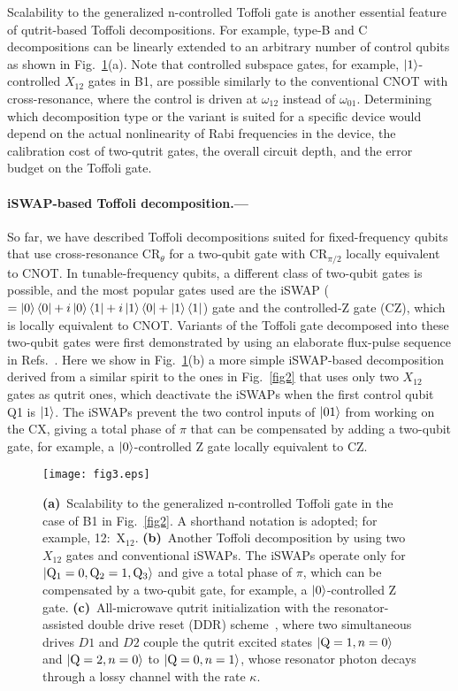 \documentclass[aps,prl,twocolumn,groupedaddress,superscriptaddress]{revtex4}
\begin{document}
Scalability to the generalized n-controlled Toffoli gate is another essential feature of qutrit-based Toffoli decompositions.
For example, type-B and C decompositions can be linearly extended to an arbitrary number of control qubits as shown in Fig.~\ref{fig3}(a).
Note that controlled subspace gates, for example, $\ket{1}$-controlled $X_{12}$ gates in B1, are possible similarly to the conventional CNOT with cross-resonance, where the control is driven at $\omega_{12}$ instead of $\omega_{01}$.
Determining which decomposition type or the variant is suited for a specific device would depend on the actual nonlinearity of Rabi frequencies in the device, the calibration cost of two-qutrit gates, the overall circuit depth, and the error budget on the Toffoli gate.

\paragraph{iSWAP-based Toffoli decomposition.---}
So far, we have described Toffoli decompositions suited for fixed-frequency qubits that use cross-resonance CR$_\theta$ for a two-qubit gate with CR$_{\pi/2}$ locally equivalent to CNOT.
In tunable-frequency qubits, a different class of two-qubit gates is possible, and the most popular gates used are the iSWAP ($=\ket{0}\bra{0} + i \ket{0}\bra{1} + i \ket{1}\bra{0} + \ket{1}\bra{1}$) gate and the controlled-Z gate (CZ), which is locally equivalent to CNOT.
Variants of the Toffoli gate decomposed into these two-qubit gates were first demonstrated by using an elaborate flux-pulse sequence in Refs.~\cite{fedorov2012,reed2012realization}.
Here we show in Fig.~\ref{fig3}(b) a more simple iSWAP-based decomposition derived from a similar spirit to the ones in Fig.~\ref{fig2} that uses only two $X_{12}$ gates as qutrit ones, which deactivate the iSWAPs when the first control qubit Q1 is $\ket{1}$.
The iSWAPs prevent the two control inputs of $\ket{01}$ from working on the CX, giving a total phase of $\pi$ that can be compensated by adding a two-qubit gate, for example, a $\ket{0}$-controlled Z gate locally equivalent to CZ.

\begin{figure}[t]
\texttt{[image: fig3.eps]}
\caption{
{\bf (a)}~Scalability to the generalized n-controlled Toffoli gate in the case of B1 in Fig.~\ref{fig2}.
A shorthand notation is adopted; for example, 12:~X$_{12}$.
{\bf (b)}~Another Toffoli decomposition by using two $X_{12}$ gates and conventional iSWAPs.
The iSWAPs operate only for $\ket{{\rm Q}_{1}=0,{\rm Q}_{2}=1,{\rm Q}_{3}}$ and give a total phase of $\pi$, which can be compensated by a two-qubit gate, for example, a $\ket{0}$-controlled Z gate.
{\bf (c)}~All-microwave qutrit initialization with the resonator-assisted double drive reset (DDR) scheme~\cite{magnard2018}, where two simultaneous drives $D1$ and $D2$ couple the qutrit excited states $\ket{{\rm Q}=1,n=0}$ and $\ket{{\rm Q}=2,n=0}$ to $\ket{{\rm Q}=0,n=1}$, whose resonator photon decays through a lossy channel with the rate $\kappa$.
\label{fig3}}
\end{figure}
\end{document}
